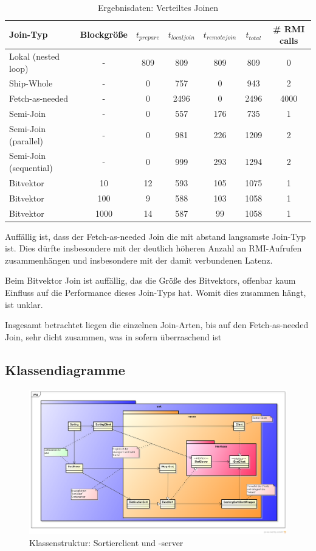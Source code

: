 \documentclass[fontsize=12pt,a4paper,headinclude=no,headings=small]{scrartcl}
\begin{document}
\begin{table}[htp]
\begin{tabularx}{\textwidth}{ |X|c|c|c|c|c|c| }
\hline
Join-Typ & Blockgröße & $t_{prepare}$ & $t_{localjoin}$ & $t_{remotejoin}$  & $t_{total}$ & \# RMI calls \\
\hline
Lokal (nested loop) & - & 809 & 809 & 809 & 809 & 0 \\
Ship-Whole & - & 0 & 757 & 0 & 943 & 2 \\
Fetch-as-needed & - & 0 & 2496 & 0 & 2496 & 4000 \\
Semi-Join & - & 0 & 557 & 176 & 735 & 1 \\
Semi-Join (parallel) & - & 0 & 981 & 226 & 1209 & 2 \\
Semi-Join (sequential) & - & 0 & 999 & 293 & 1294 & 2 \\
Bitvektor & 10 & 12 & 593 & 105 & 1075 & 1 \\
Bitvektor & 100 & 9 & 588 & 103 & 1058 & 1 \\
Bitvektor & 1000 & 14 & 587 & 99 & 1058 & 1 \\
\hline
\end{tabularx}
\caption{Ergebnisdaten: Verteiltes Joinen}
\end{table}
Auffällig ist, dass der Fetch-as-needed Join die mit abstand langsamste Join-Typ ist. Dies dürfte insbesondere mit der deutlich höheren Anzahl an RMI-Aufrufen zusammenhängen und insbesondere mit der damit verbundenen Latenz.

Beim Bitvektor Join ist auffällig, das die Größe des Bitvektors, offenbar kaum Einfluss auf die Performance dieses Join-Typs hat. Womit dies zusammen hängt, ist unklar. 

Insgesamt betrachtet liegen die einzelnen Join-Arten, bis auf den Fetch-as-needed Join, sehr dicht zusammen, was in sofern überraschend ist

\begin{appendix}
\section{Klassendiagramme}
\begin{figure}[H]
	\centering
 	\includegraphics[width=\textwidth]{Klassenstruktur.png}
	\caption{Klassenstruktur: Sortierclient und -server}
\end{figure}
\end{appendix}
\end{document}
